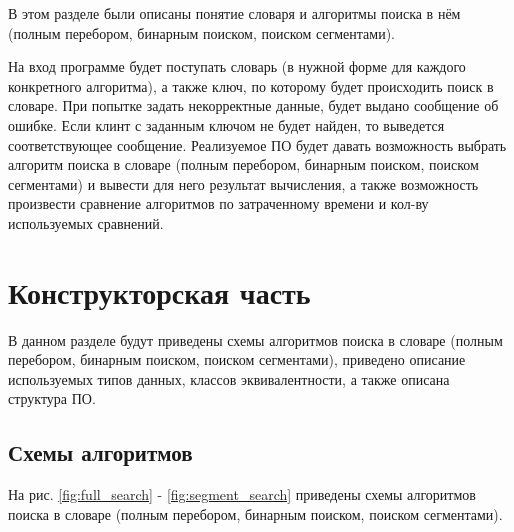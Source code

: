 \documentclass[a4paper,14pt, unknownkeysallowed]{extreport}
\begin{document}
В этом разделе были описаны понятие словаря и алгоритмы поиска в нём (полным перебором, бинарным поиском, поиском сегментами).

На вход программе будет поступать словарь (в нужной форме для каждого конкретного алгоритма), а также ключ, по которому будет происходить поиск в словаре. При попытке задать некорректные данные, будет выдано сообщение об ошибке. Если клинт с заданным ключом не будет найден, то выведется соответствующее сообщение. Реализуемое ПО будет давать возможность выбрать алгоритм поиска в словаре (полным перебором, бинарным поиском, поиском сегментами) и вывести для него результат вычисления, а также возможность произвести сравнение алгоритмов по затраченному времени и кол-ву используемых сравнений.





\chapter{Конструкторская часть}

В данном разделе будут приведены схемы алгоритмов поиска в словаре (полным перебором, бинарным поиском, поиском сегментами), приведено описание используемых типов данных, классов эквивалентности, а также описана структура ПО.

\section{Схемы алгоритмов}

На рис. \ref{fig:full_search} - \ref{fig:segment_search} приведены схемы алгоритмов поиска в словаре (полным перебором, бинарным поиском, поиском сегментами).
\end{document}
